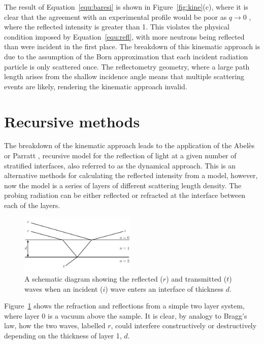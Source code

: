 \documentclass[
 reprint,
 superscriptaddress,
 amsmath,amssymb,
 aps,
]{revtex4-1}
\begin{document}
%
The result of Equation~\ref{equ:baresi} is shown in Figure~\ref{fig:kine}(c), where it is clear that the agreement with an experimental profile would be poor as $q \to 0$ \cite{majkrzak_exact_1998}, where the reflected intensity is greater than \num{1}. 
This violates the physical condition imposed by Equation~\ref{equ:refl}, with more neutrons being reflected than were incident in the first place.
The breakdown of this kinematic approach is due to the assumption of the Born approximation that each incident radiation particle is only scattered once. 
The reflectometry geometry, where a large path length arises from the shallow incidence angle means that multiple scattering events are likely, rendering the kinematic approach invalid. 

\section{Recursive methods}
The breakdown of the kinematic approach leads to the application of the Abel\`{e}s \cite{abeles_sur_1948} or Parratt \cite{parratt_surface_1954}, recursive model for the reflection of light at a given number of stratified interfaces, also referred to as the dynamical approach. 
This is an alternative methods for calculating the reflected intensity from a model, however, now the model is a series of layers of different scattering length density. 
The probing radiation can be either reflected or refracted at the interface between each of the layers. 
%
\begin{figure}[t]
    \includegraphics[width=0.49\textwidth]{refr}
    \caption{A schematic diagram showing the reflected ($r$) and transmitted ($t$) waves when an incident ($i$) wave enters an interface of thickness $d$.}
    \label{fig:refr}
\end{figure}
% 
Figure~\ref{fig:refr} shows the refraction and reflections from a simple two layer system, where layer \num{0} is a vacuum above the sample. 
It is clear, by analogy to Bragg's law, how the two waves, labelled $r$, could interfere constructively or destructively depending on the thickness of layer \num{1}, $d$.
\end{document}
